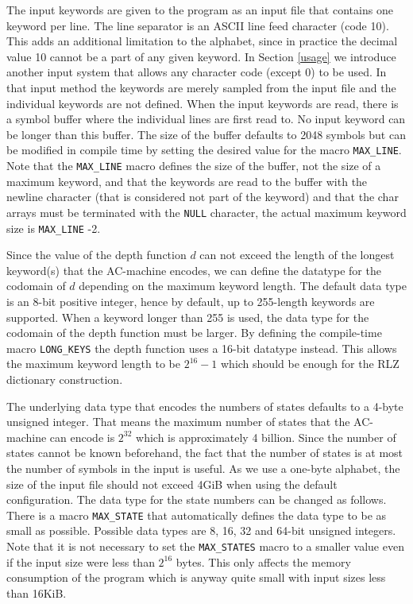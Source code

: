 \documentclass[english,twoside,censored,csm,algorithms-track-2020]{HYthesisML}
\theoremstyle{plain}
\theoremstyle{definition}
\numberwithin{testexample}{chapter}
\begin{document}
The input keywords are given to the program as an input file that contains one keyword per line. The
line separator is an ASCII line feed character (code 10). This adds an additional limitation to the
alphabet, since in practice the decimal value 10 cannot be a part of any given keyword. In Section
\ref{usage} we introduce another input system that allows any character code (except 0) to be used. In
that input method the keywords are merely sampled from the input file and the individual keywords
are not defined. When the input keywords are read, there is a symbol buffer where the individual lines
are first read to. No input keyword can be longer than this buffer. The size of the buffer defaults
to 2048 symbols but can be modified in compile time by setting the desired value for the macro
\texttt{MAX\_LINE}.
Note that the \texttt{MAX\_LINE} macro defines the size of the buffer, not the size of a maximum
keyword, and
that the keywords are read to the buffer with the newline character (that is considered not part of the keyword)
and that the char arrays must be terminated with the \texttt{NULL} character, the actual maximum
keyword size is \texttt{MAX\_LINE} -2.

Since the value of the depth function $d$ can not exceed the length of the longest keyword(s) that the
AC-machine encodes, we can define the datatype for the codomain of $d$ depending on the maximum
keyword length. The default data type is an 8-bit positive integer, hence by default,
up to 255-length keywords are supported.
When a keyword longer than 255 is used, the data type for the codomain of the depth function
must be larger. By defining the compile-time macro \texttt{LONG\_KEYS} the depth function
uses a 16-bit datatype instead. This allows the maximum keyword length to be $2^{16}-1$ which
should be enough for the RLZ dictionary construction.

The underlying data type that encodes the numbers of states defaults to a 4-byte unsigned integer. That
means the maximum number of states that the AC-machine can encode is $2^{32}$ which is approximately
4 billion. Since the number of states cannot be known beforehand, the fact that the number of states
is at most the number of symbols in the input is useful. As we use a one-byte alphabet, the size
of the input file should not exceed 4GiB when using the default configuration. The data type
for the state numbers can be changed as follows. There is a macro \texttt{MAX\_STATE} that automatically
defines the data type to be as small as possible. Possible data types are 8, 16, 32 and 64-bit
unsigned integers. Note that it is not necessary to set the \texttt{MAX\_STATES} macro to a smaller value
even if the input size were less than $2^{16}$ bytes. This only affects the memory consumption of
the program which is anyway quite small with input sizes less than 16KiB.
\end{document}
